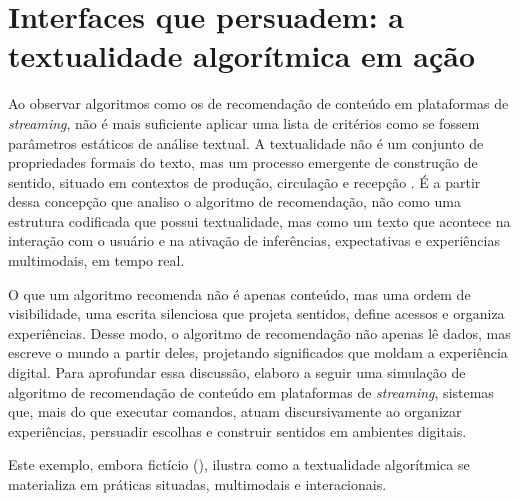 \documentclass[portuguese]{textolivre}
\begin{document}
\section{Interfaces que persuadem: a textualidade algorítmica em ação}\label{sec-organizacao}
Ao observar algoritmos como os de recomendação de conteúdo em plataformas de \textit{streaming}, não é mais suficiente aplicar uma lista de critérios como se fossem parâmetros estáticos de análise textual. A textualidade não é um conjunto de propriedades formais do texto, mas um processo emergente de construção de sentido, situado em contextos de produção, circulação e recepção \cite{koch2006,marcuschi2008,beaugrande1997}. É a partir dessa concepção que analiso o algoritmo de recomendação, não como uma estrutura codificada que possui textualidade, mas como um texto que acontece na interação com o usuário e na ativação de inferências, expectativas e experiências multimodais, em tempo real.

O que um algoritmo recomenda não é apenas conteúdo, mas uma ordem de visibilidade, uma escrita silenciosa que projeta sentidos, define acessos e organiza experiências. Desse modo, o algoritmo de recomendação não apenas lê dados, mas escreve o mundo a partir deles, projetando significados que moldam a experiência digital. Para aprofundar essa discussão, elaboro a seguir uma simulação de algoritmo de recomendação de conteúdo em plataformas de \textit{streaming}, sistemas que, mais do que executar comandos, atuam discursivamente ao organizar experiências, persuadir escolhas e construir sentidos em ambientes digitais.

Este exemplo, embora fictício (), ilustra como a textualidade algorítmica se materializa em práticas situadas, multimodais e interacionais.
\end{document}
